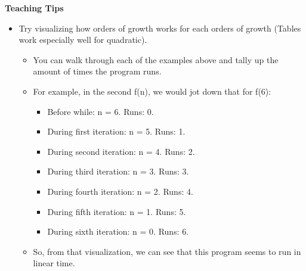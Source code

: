 \begin{guide}
   \textbf{Teaching Tips}
   \begin{itemize}
      \item Try visualizing how orders of growth works for each orders of growth (Tables work especially well for quadratic).
      \begin{itemize}
      \item You can walk through each of the examples above and tally up the amount of times the program runs. 
      \item For example, in the second f(n), we would jot down that for f(6):
      \begin{itemize}
         \item Before while: n = 6. Runs: 0.
         \item During first iteration: n = 5. Runs: 1.
         \item During second iteration: n = 4. Runs: 2.
         \item During third iteration: n = 3. Runs: 3.
         \item During fourth iteration: n = 2. Runs: 4.
         \item During fifth iteration: n = 1. Runs: 5.
         \item During sixth iteration: n = 0. Runs: 6.
      \end{itemize}
      \item So, from that visualization, we can see that this program seems to run in linear time. 
      \end{itemize}
   \end{itemize}
\end{guide}